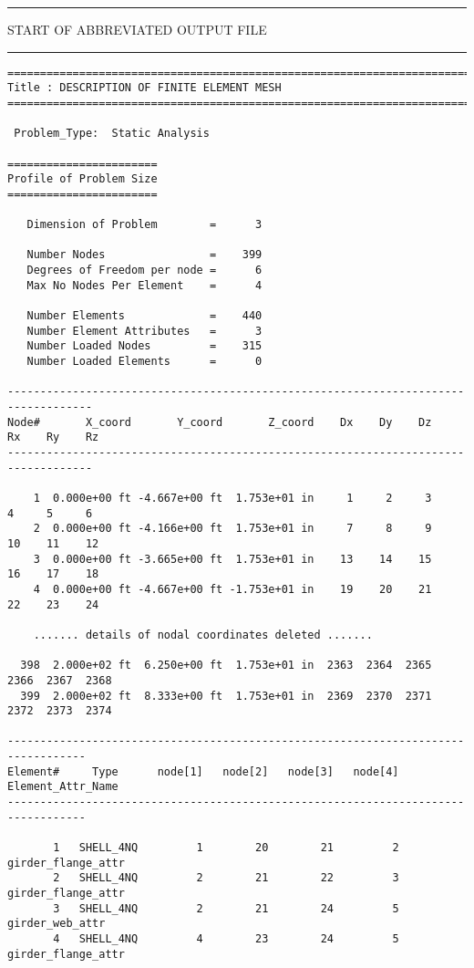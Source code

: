 \vspace{0.25 truein}
\begin{footnotesize}
\noindent
{\rule{1.7 in}{0.035 in} START OF ABBREVIATED OUTPUT FILE \rule{1.7 in}{0.035 in} }
\begin{verbatim}
===========================================================================
Title : DESCRIPTION OF FINITE ELEMENT MESH                                 
===========================================================================

 Problem_Type:  Static Analysis

=======================
Profile of Problem Size
=======================

   Dimension of Problem        =      3

   Number Nodes                =    399
   Degrees of Freedom per node =      6
   Max No Nodes Per Element    =      4

   Number Elements             =    440
   Number Element Attributes   =      3
   Number Loaded Nodes         =    315
   Number Loaded Elements      =      0

-----------------------------------------------------------------------------------
Node#       X_coord       Y_coord       Z_coord    Dx    Dy    Dz    Rx    Ry    Rz
-----------------------------------------------------------------------------------

    1  0.000e+00 ft -4.667e+00 ft  1.753e+01 in     1     2     3     4     5     6 
    2  0.000e+00 ft -4.166e+00 ft  1.753e+01 in     7     8     9    10    11    12 
    3  0.000e+00 ft -3.665e+00 ft  1.753e+01 in    13    14    15    16    17    18 
    4  0.000e+00 ft -4.667e+00 ft -1.753e+01 in    19    20    21    22    23    24 

    ....... details of nodal coordinates deleted .......

  398  2.000e+02 ft  6.250e+00 ft  1.753e+01 in  2363  2364  2365  2366  2367  2368 
  399  2.000e+02 ft  8.333e+00 ft  1.753e+01 in  2369  2370  2371  2372  2373  2374 

----------------------------------------------------------------------------------
Element#     Type      node[1]   node[2]   node[3]   node[4]    Element_Attr_Name
----------------------------------------------------------------------------------

       1   SHELL_4NQ         1        20        21         2    girder_flange_attr
       2   SHELL_4NQ         2        21        22         3    girder_flange_attr
       3   SHELL_4NQ         2        21        24         5    girder_web_attr
       4   SHELL_4NQ         4        23        24         5    girder_flange_attr


\end{verbatim}
\end{footnotesize}
